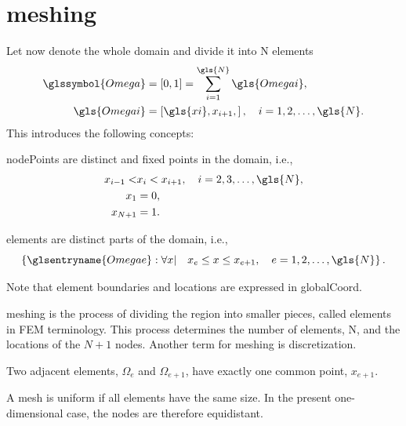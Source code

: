 \section[Meshing]{\Gls{meshing}}
Let now  denote the whole \gls{domain} and divide it into \gls{N} elements
\begin{subequations} \label{eqn:Element_Locations}
	\begin{align}
		\glssymbol{Omega} &= \left[ 0, 1 \right] = \sum \limits_{i = 1}^{\gls{N}} \gls{Omegai}, \label{eqn:Whole_Region}	\\
		\gls{Omegai} &= \left[ \gls{xi},  x_{i + 1}, \right], \quad i = 1, 2, \dots, \gls{N}.	\label{eqn:Element_No_i}
	\end{align}
\end{subequations}
%
This introduces the following concepts:
\begin{definition}
	\Glspl{nodePoint} are distinct and fixed points in the \gls{domain}, i.e.,
	\begin{align}
		x_{i - 1} < & x_{i} < x_{i + 1}, \quad i = 2, 3, \dots, \gls{N}, \\
		x_1  & = 0, \\
		x_{N + 1} & = 1.
	\end{align}
\end{definition}
\begin{definition}
	\Glspl{element} are distinct parts of the \gls{domain}, i.e.,
	\begin{equation}
		\left\{ \glsentryname{Omegae}: \forall x \vert \quad x_{e} \le x \le x_{e + 1}, \quad e = 1, 2, \dots, \gls{N} \right\} .
	\end{equation}
\end{definition}
Note that element boundaries and locations are expressed in \gls{globalCoord}.
\begin{definition}
	\Gls{meshing} is the process of dividing the region into smaller pieces, called elements in FEM terminology. This process
	determines the number of elements, \gls{N}, and the locations of the $N+1$ nodes. Another term for meshing is discretization.
\end{definition}
\begin{remark}
	Two adjacent elements, $\Omega_e$ and $\Omega_{e+1}$, have exactly one common point, $x_{e+1}$.
\end{remark}
\begin{definition}
	A mesh is uniform if all elements have the same size. In the present one-dimensional case, the nodes are therefore equidistant.
\end{definition}
